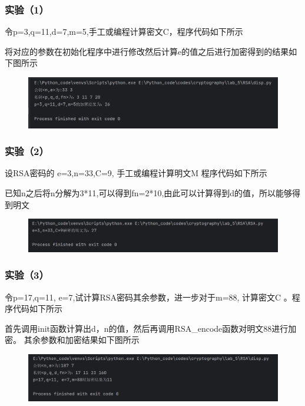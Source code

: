 \documentclass[a4paper,11pt,UTF8]{ctexart}
\newcommand{\bottomcaption}{%
\setlength{\abovecaptionskip}{6pt}%
\setlength{\belowcaptionskip}{6pt}%
\caption}
\newcommand{\xiaowuhao}{\fontsize{9pt}{\baselineskip}\selectfont}   %
\begin{document}
        \subsubsection{实验（1）}
            令p=3,q=11,d=7,m=5,手工或编程计算密文C，程序代码如下所示
            
            将对应的参数在初始化程序中进行修改然后计算e的值之后进行加密得到的结果如下图所示
            \begin{figure}[H]
                \centering
                \includegraphics[width=13cm]{RSA_result1.png}
                \bottomcaption{\xiaowuhao{测试算法1运行结果}}
            \end{figure}
            
        \subsubsection{实验（2）}
            设RSA密码的 e=3,n=33,C=9, 手工或编程计算明文M 程序代码如下所示
            
            已知n之后将n分解为3*11,可以得到fn=2*10,由此可以计算得到d的值，所以能够得到明文
            \begin{figure}[H]
                \centering
                \includegraphics[width=13cm]{RSA_result2.png}
                \bottomcaption{\xiaowuhao{测试算法2运行结果}}
            \end{figure}

        \subsubsection{实验（3）}
            令p=17,q=11, e=7,试计算RSA密码其余参数，进一步对于m=88, 计算密文C 。程序代码如下所示
            
            首先调用init函数计算出d，n的值，然后再调用RSA\_encode函数对明文88进行加密。
            其余参数和加密结果如下图所示
            \begin{figure}[H]
                \centering
                \includegraphics[width=13cm]{RSA_result3.png}
                \bottomcaption{\xiaowuhao{测试算法3运行结果}}
            \end{figure}
\end{document}

